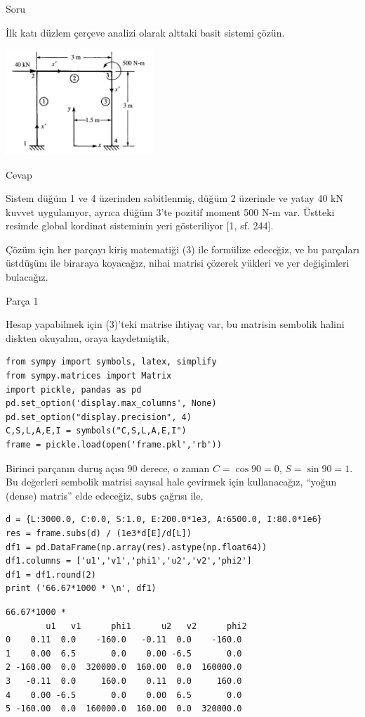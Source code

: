\documentclass[12pt,fleqn]{article}\usepackage{../../common}
\begin{document}
Soru

İlk katı düzlem çerçeve analizi olarak alttaki basit sistemi çözün.

\includegraphics[width=15em]{phy_020_strs_06_03.jpg}

Cevap

Sistem düğüm 1 ve 4 üzerinden sabitlenmiş, düğüm 2 üzerinde ve yatay 40 kN
kuvvet uygulanıyor, ayrıca düğüm 3'te pozitif moment 500 N-m var. Üstteki
resimde global kordinat sisteminin yeri gösteriliyor [1, sf. 244].

Çözüm için her parçayı kiriş matematiği (3) ile formülize edeceğiz, ve bu
parçaları üstdüşüm ile biraraya koyacağız, nihai matrisi çözerek yükleri ve yer
değişimleri bulacağız.

Parça 1

Hesap yapabilmek için (3)'teki matrise ihtiyaç var, bu matrisin sembolik
halini diskten okuyalım, oraya kaydetmiştik, 

\begin{verbatim}
from sympy import symbols, latex, simplify
from sympy.matrices import Matrix
import pickle, pandas as pd
pd.set_option('display.max_columns', None)
pd.set_option("display.precision", 4)
C,S,L,A,E,I = symbols("C,S,L,A,E,I")
frame = pickle.load(open('frame.pkl','rb'))
\end{verbatim}

Birinci parçanın duruş açısı 90 derece, o zaman $C = \cos 90 = 0$, $S = \sin 90
= 1$.  Bu değerleri sembolik matrisi sayısal hale çevirmek için kullanacağız,
``yoğun (dense) matris'' elde edeceğiz, \verb!subs! çağrısı ile,

\begin{verbatim}
d = {L:3000.0, C:0.0, S:1.0, E:200.0*1e3, A:6500.0, I:80.0*1e6}
res = frame.subs(d) / (1e3*d[E]/d[L])
df1 = pd.DataFrame(np.array(res).astype(np.float64))
df1.columns = ['u1','v1','phi1','u2','v2','phi2']
df1 = df1.round(2)
print ('66.67*1000 * \n', df1)
\end{verbatim}

\begin{verbatim}
66.67*1000 * 
        u1   v1      phi1      u2   v2      phi2
0    0.11  0.0    -160.0   -0.11  0.0    -160.0
1    0.00  6.5       0.0    0.00 -6.5       0.0
2 -160.00  0.0  320000.0  160.00  0.0  160000.0
3   -0.11  0.0     160.0    0.11  0.0     160.0
4    0.00 -6.5       0.0    0.00  6.5       0.0
5 -160.00  0.0  160000.0  160.00  0.0  320000.0
\end{verbatim}
\end{document}
